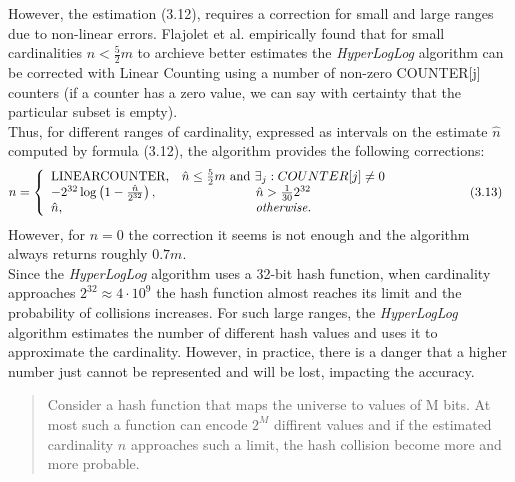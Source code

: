 \documentclass[a4paper,13pt]{article}
\theoremstyle{mytheor}
\begin{document}
\indent However, the estimation (3.12), requires a correction for small and large
ranges due to non-linear errors. Flajolet et al. empirically found that for
small cardinalities $n < \frac{5}{2}m$ to archieve better estimates the \textit{HyperLogLog}
algorithm can be corrected with Linear Counting using a number of
non-zero COUNTER[j] counters (if a counter has a zero value, we can say
with certainty that the particular subset is empty).\\
\indent Thus, for different ranges of cardinality, expressed as intervals on
the estimate $\hat{n}$ computed by formula (3.12), the algorithm provides
the following corrections:
\[
    n = \left\{ \begin{array}{lcl}
        \text{LINEARCOUNTER,} & \hat{n} \leq \frac{5}{2}m \mbox{ and } \exists_j : COUNTER[j] \neq 0 \\ 
        -2^{32}\log\left(1-\frac{\hat{n}}{2^{32}}\right), & \hat{n}>\frac{1}{30}2^{32} & \mbox{\hspace{2cm}(3.13)} \\
        \hat{n}, & \textit{otherwise.}
        \end{array}\right.    
\]
\indent However, for $n = 0$ the correction it seems is not enough and
the algorithm always returns roughly $0.7m$.\\
\indent Since the \textit{HyperLogLog} algorithm uses a 32-bit hash function, when
cardinality approaches $2^{32}\approx 4 \cdot 10^9$ the hash function almost reaches its
limit and the probability of collisions increases. For such large ranges,
the \textit{HyperLogLog} algorithm estimates the number of different hash values
and uses it to approximate the cardinality. However, in practice, there is
a danger that a higher number just cannot be represented and will be
lost, impacting the accuracy.\\
\vspace{0.25cm}
\begin{quote}
    Consider a hash function that maps the universe to values of M bits.
    At most such a function can encode $2^M$ diffirent values and if the estimated
    cardinality $n$ approaches such a limit, the hash collision become more and more probable.
    \vspace{0.25cm}
\end{quote}
\end{document}
